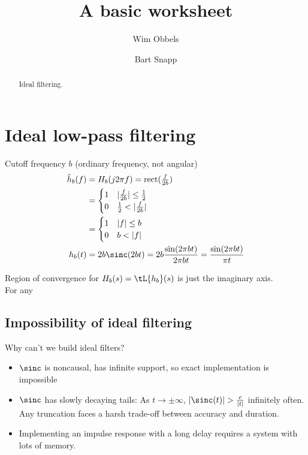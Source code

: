\documentclass{ximera}
\title{A basic worksheet}
\author{Wim Obbels \and Bart Snapp}
\begin{document}
\begin{abstract}
    Ideal filtering.
\end{abstract}
\maketitle
\label{xim:idealFiltering}

\section{Ideal low-pass filtering}
  Cutoff frequency $b$ (ordinary frequency, not angular)
    \begin{align*}
      \hat{h}_b(f)
      &= H_b(j2\pi f) = \operatorname{rect}(\tfrac{f}{2b})\\
      &= \begin{cases}
      1 & |\tfrac{f}{2b}| \leq \tfrac{1}{2}\\
      0 & \tfrac{1}{2} < |\tfrac{f}{2b}|
    \end{cases}\\
      &= \begin{cases}
      1 & |f| \leq b\\
      0 & b < |f|
    \end{cases}\\
      h_b(t)
      &= 2 b \sinc(2 b t) = 2 b\frac{\sin(2 \pi b t)}{2 \pi b t} = \frac{\sin(2 \pi b t)}{\pi t}
    \end{align*}

    Region of convergence for $H_b(s) = \tL{h_b}(s)$ is just the imaginary axis.\\

    For any 
  


\subsection{Impossibility of ideal filtering}
  Why can't we build ideal filters?
  \begin{itemize}
  \item $\sinc$ is noncausal, has infinite support, so exact implementation is impossible
  \item $\sinc$ has slowly decaying tails: As $t \to \pm \infty$, $|\sinc(t)| > \frac{c}{|t|}$ infinitely often.\\
    Any truncation faces a harsh trade-off between accuracy and duration.\\
  \item Implementing an impulse response with a long delay requires a system with lots of memory.

  \end{itemize}
 
\end{document}
